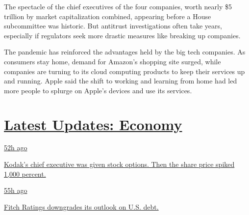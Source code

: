 The spectacle of the chief executives of the four companies, worth
nearly \$5 trillion by market capitalization combined, appearing before
a House subcommittee was historic. But antitrust investigations often
take years, especially if regulators seek more drastic measures like
breaking up companies.

The pandemic has reinforced the advantages held by the big tech
companies. As consumers stay home, demand for Amazon's shopping site
surged, while companies are turning to its cloud computing products to
keep their services up and running. Apple said the shift to working and
learning from home had led more people to splurge on Apple's devices and
use its services.

\hypertarget{latest-updates-economy}{%
\section{\texorpdfstring{\href{https://www.nytimes3xbfgragh.onion/live/2020/07/31/business/stock-market-today-coronavirus?action=click\&pgtype=Article\&state=default\&region=MAIN_CONTENT_1\&context=storylines_live_updates}{Latest
Updates:
Economy}}{Latest Updates: Economy}}\label{latest-updates-economy}}

\href{https://www.nytimes3xbfgragh.onion/live/2020/07/31/business/stock-market-today-coronavirus?action=click\&pgtype=Article\&state=default\&region=MAIN_CONTENT_1\&context=storylines_live_updates\#kodaks-chief-executive-was-given-stock-options-then-the-share-price-spiked-1000-percent}{52h
ago}

\href{https://www.nytimes3xbfgragh.onion/live/2020/07/31/business/stock-market-today-coronavirus?action=click\&pgtype=Article\&state=default\&region=MAIN_CONTENT_1\&context=storylines_live_updates\#kodaks-chief-executive-was-given-stock-options-then-the-share-price-spiked-1000-percent}{Kodak's
chief executive was given stock options. Then the share price spiked
1,000 percent.}

\href{https://www.nytimes3xbfgragh.onion/live/2020/07/31/business/stock-market-today-coronavirus?action=click\&pgtype=Article\&state=default\&region=MAIN_CONTENT_1\&context=storylines_live_updates\#fitch-ratings-downgrades-its-outlook-on-us-debt}{55h
ago}

\href{https://www.nytimes3xbfgragh.onion/live/2020/07/31/business/stock-market-today-coronavirus?action=click\&pgtype=Article\&state=default\&region=MAIN_CONTENT_1\&context=storylines_live_updates\#fitch-ratings-downgrades-its-outlook-on-us-debt}{Fitch
Ratings downgrades its outlook on U.S. debt.}

